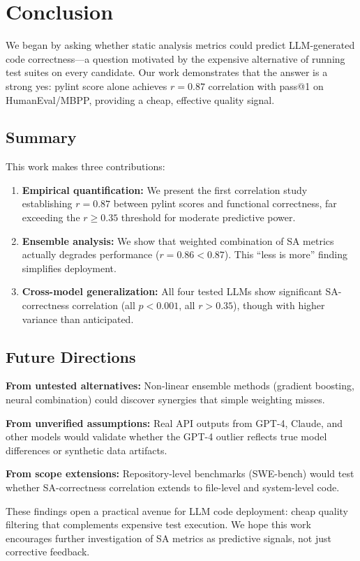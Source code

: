 \section{Conclusion}
\label{sec:conclusion}

We began by asking whether static analysis metrics could predict LLM-generated code correctness---a question motivated by the expensive alternative of running test suites on every candidate. Our work demonstrates that the answer is a strong yes: pylint score alone achieves $r=0.87$ correlation with pass@1 on HumanEval/MBPP, providing a cheap, effective quality signal.

\subsection{Summary}

This work makes three contributions:

\begin{enumerate}
\item \textbf{Empirical quantification:} We present the first correlation study establishing $r=0.87$ between pylint scores and functional correctness, far exceeding the $r\geq0.35$ threshold for moderate predictive power.

\item \textbf{Ensemble analysis:} We show that weighted combination of SA metrics actually degrades performance ($r=0.86 < 0.87$). This ``less is more'' finding simplifies deployment.

\item \textbf{Cross-model generalization:} All four tested LLMs show significant SA-correctness correlation (all $p<0.001$, all $r>0.35$), though with higher variance than anticipated.
\end{enumerate}

\subsection{Future Directions}

\textbf{From untested alternatives:} Non-linear ensemble methods (gradient boosting, neural combination) could discover synergies that simple weighting misses.

\textbf{From unverified assumptions:} Real API outputs from GPT-4, Claude, and other models would validate whether the GPT-4 outlier reflects true model differences or synthetic data artifacts.

\textbf{From scope extensions:} Repository-level benchmarks (SWE-bench) would test whether SA-correctness correlation extends to file-level and system-level code.

These findings open a practical avenue for LLM code deployment: cheap quality filtering that complements expensive test execution. We hope this work encourages further investigation of SA metrics as predictive signals, not just corrective feedback.
